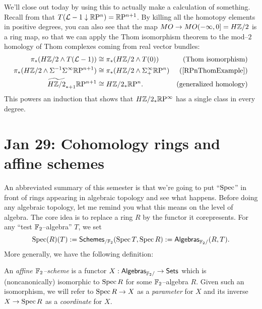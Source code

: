 We'll close out today by using this to actually make a calculation of something. Recall from  that $T(\mathcal{L} - 1 \downarrow \mathbb R\mathrm P^n) = \mathbb R\mathrm P^{n+1}$.  By killing all the homotopy elements in positive degrees, you can also see that the map $MO \to MO(-\infty, 0] = H\mathbb Z/2$ is a ring map, so that we can apply the Thom isomorphism theorem to the mod--$2$ homology of Thom complexes coming from real vector bundles:
\begin{align*}
\pi_* (H\Z/2 \sm T(\L - 1)) & \cong \pi_* (H\Z/2 \sm T(0)) & \text{(Thom isomorphism)} \\
\pi_* (H\Z/2 \sm \Susp^{-1} \Susp^\infty \RP^{n+1}) & \cong \pi_* (H\Z/2 \sm \Susp^\infty_+ \RP^n) & \text{(\Cref{RPnThomExample})} \\
\widetilde{H\Z/2}_{*+1} \RP^{n+1} & \cong H\Z/2_* \RP^n. & \text{(generalized homology)}
\end{align*}
This powers an induction that shows that $H\mathbb Z/2_* \mathbb R\mathrm P^\infty$ has a single class in every degree.






\section{Jan 29: Cohomology rings and affine schemes}

An abbreviated summary of this semester is that we're going to put ``$\operatorname{Spec}$'' in front of rings appearing in algebraic topology and see what happens.  Before doing any algebraic topology, let me remind you what this means on the level of algebra.  The core idea is to replace a ring $R$ by the functor it corepresents.  For any ``test $\mathbb F_2$--algebra'' $T$, we set \[\operatorname{Spec}(R)(T) := \mathsf{Schemes}_{/\mathbb F_2}(\operatorname{Spec} T, \operatorname{Spec} R) := \mathsf{Algebras}_{\mathbb F_2/}(R, T).\]  More generally, we have the following definition:
\begin{definition}
An \textit{affine $\mathbb F_2$--scheme} is a functor $X: \mathsf{Algebras}_{\mathbb F_2/} \to \mathsf{Sets}$ which is (noncanonically) isomorphic to $\operatorname{Spec} R$ for some $\mathbb F_2$--algebra $R$.  Given such an isomorphism, we will refer to $\operatorname{Spec} R \to X$ as a \textit{parameter} for $X$ and its inverse $X \to \operatorname{Spec} R$ as a \textit{coordinate} for $X$.
\end{definition}

